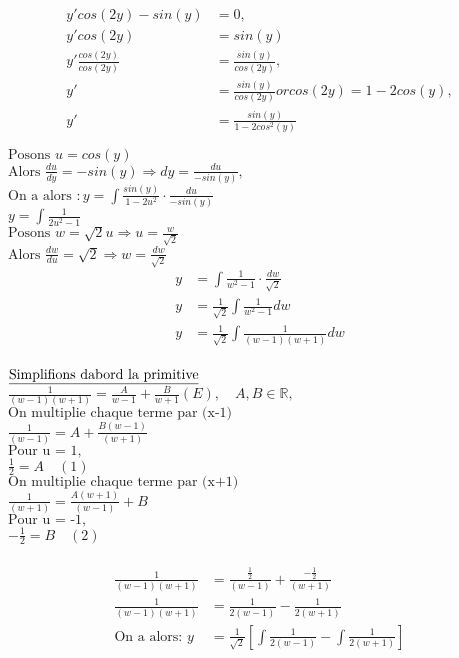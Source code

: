 \begin{align*}
	y'cos(2y) - sin(y) &= 0, \\
	y'cos(2y) &= sin(y)  \\
	y'\frac{cos(2y)}{cos(2y)} &= \frac{sin(y)}{cos(2y)} , \\
	y' &= \frac{sin(y)}{cos(2y)} or cos(2y) =  1-2cos(y) , \\
	y' &= \frac{sin(y)}{1-2cos^2(y)}  \\ \\
\end{align*}
	$ \text{Posons } u = cos(y)  $\\
	$ \text{Alors } \frac{du}{dy} = -sin(y) \Rightarrow dy = \frac{du}{-sin(y)} , $\\
	$ \text{On a alors }: y = \int \frac{sin(y)}{1-2u^2} \cdot \frac{du}{-sin(y)}  $\\
	$ y = \int\frac{1}{2u^2-1} $\\
	$ \text{Posons } w = \sqrt{2}u \Rightarrow u = \frac{w}{\sqrt{2}}  $\\
	$ \text{Alors }\frac{dw}{du} = \sqrt{2} \Rightarrow w = \frac{dw}{\sqrt{2}} $\\

\begin{align*}
	y &= \int\frac{1}{w^2-1} \cdot \frac{dw}{\sqrt{2}} \\
	y &= \frac{1}{\sqrt{2}}\int\frac{1}{w^2-1} dw \\
	y &= \frac{1}{\sqrt{2}}\int\frac{1}{(w-1)(w+1)} dw \\
\end{align*}


$ \text{\underline{Simplifions dabord la primitive}} $ \\
$ \frac{1}{(w-1)(w+1)} = \frac{A}{w-1} + \frac{B}{w+1} (E), \quad A, B \in\mathbb{R} , $ \\
$ \text{On multiplie chaque terme par (x-1)}  $ \\
$ \frac{1}{(w-1)} = A + \frac{B(w-1)}{(w+1)} $ \\
$ \text{Pour u = 1},  $ \\
$ \frac{1}{2} = A \quad (1) $ \\
$ \text{On multiplie chaque terme par (x+1)}  $ \\
$ \frac{1}{(w+1)} = \frac{A(w+1)}{(w-1)} + B $ \\
$ \text{Pour u = -1},  $ \\
$ -\frac{1}{2} = B \quad (2) $ \\

 \\
\begin{align*}
	\frac{1}{(w-1)(w+1)} &= \frac{\frac{1}{2}}{(w-1)} + \frac{-\frac{1}{2}}{(w+1)} \\
	\frac{1}{(w-1)(w+1)} &= \frac{1}{2(w-1)} - \frac{1}{2(w+1)} \\
	\text{On a alors: } y &= \frac{1}{\sqrt{2}}[\int\frac{1}{2(w-1)} - \int\frac{1}{2(w+1)}] \\
\end{align*}

